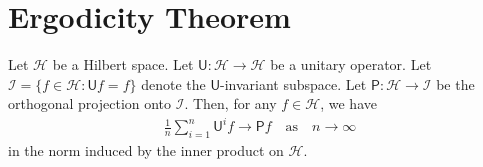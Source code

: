 \documentclass[a4paper]{article}
\begin{document}
\section{Ergodicity Theorem}

\begin{theorem}\label{thm:von-neumann-ergodicity}
	Let $\mathcal{H}$ be a Hilbert space.
	Let $\mathsf{U}:\mathcal{H}\to \mathcal{H}$ be a unitary operator.
	Let $\mathcal{I}=\{f\in \mathcal{H}:\mathsf{U}f=f\}$ denote the $\mathsf{U}$-invariant subspace.
	Let $\mathsf{P}:\mathcal{H}\to\mathcal{I}$ be the orthogonal projection onto $\mathcal{I}$.
	Then, for any $f\in\mathcal{H}$, we have
	\begin{align}\label{eq:ergodicity}
		\frac1n \sum_{i=1}^{n} \mathsf{U}^i f
		\to
		\mathsf{P}f
		\quad\text{as}\quad
		n\to\infty
	\end{align}
	in the norm induced by the inner product on $\mathcal{H}$.
\end{theorem}
\end{document}
